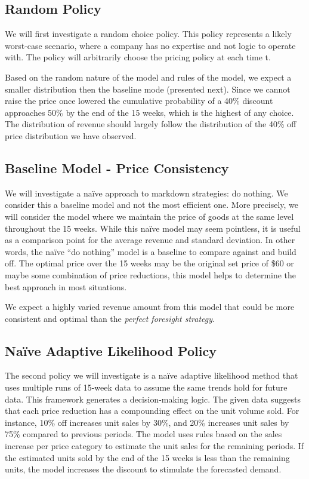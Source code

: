 \documentclass[11pt,a4paper]{article}
\begin{document}
\subsection{Random Policy}
We will first investigate a random choice policy. 
This policy represents a likely worst-case scenario, where a company has no expertise and not logic to operate with. 
The policy will arbitrarily choose the pricing policy at each time t.  

Based on the random nature of the model and rules of the model, we expect a smaller distribution then the baseline mode (presented next). 
Since we cannot raise the price once lowered the cumulative probability of a 40\% discount approaches 50\% by the end of the 15 weeks, which is the highest of any choice. 
The distribution of revenue should largely follow the distribution of the 40\% off price distribution we have observed. 

\subsection{Baseline Model - Price Consistency}
We will investigate a naïve approach to markdown strategies: do nothing. 
We consider this a baseline model and not the most efficient one. 
More precisely, we will consider the model where we maintain the price of goods at the same level throughout the 15 weeks. 
While this naïve model may seem pointless, it is useful as a comparison point for the average revenue and standard deviation. 
In other words, the naïve “do nothing” model is a baseline to compare against and build off. 
The optimal price over the 15 weeks may be the original set price of \$60 or maybe some combination of price reductions, this model helps to determine the best approach in most situations.

We expect a highly varied revenue amount from this model that could be more consistent and optimal than the \emph{perfect foresight strategy}.

\subsection{Naïve Adaptive Likelihood Policy}
The second policy we will investigate is a naïve adaptive likelihood method that uses multiple runs of 15-week data to assume the same trends hold for future data. 
This framework generates a decision-making logic. The given data suggests that each price reduction has a compounding effect on the unit volume sold. For instance, 10\% off increases unit sales by 30\%, and 20\% increases unit sales by 75\% compared to previous periods. 
The model uses rules based on the sales increase per price category to estimate the unit sales for the remaining periods. 
If the estimated units sold by the end of the 15 weeks is less than the remaining units, the model increases the discount to stimulate the forecasted demand. 
\end{document}
